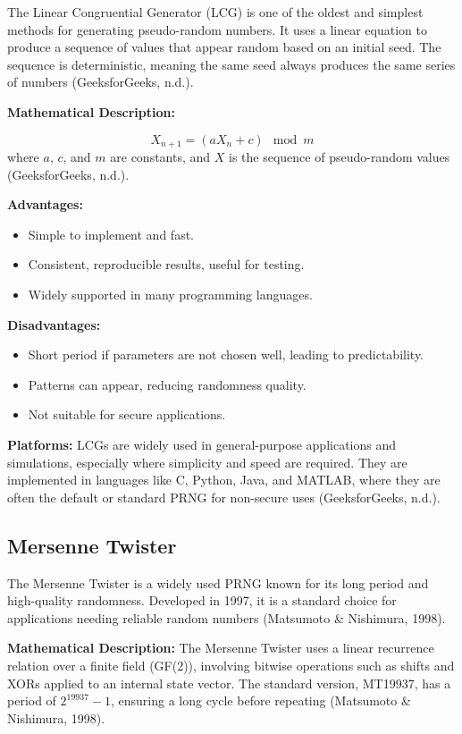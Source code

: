 \documentclass[a4paper,12pt]{report}
\begin{document}
The Linear Congruential Generator (LCG) is one of the oldest and simplest methods for generating pseudo-random numbers. It uses a linear equation to produce a sequence of values that appear random based on an initial seed. The sequence is deterministic, meaning the same seed always produces the same series of numbers (GeeksforGeeks, n.d.).

\textbf{Mathematical Description:} 

\[X_{n+1} = (aX_n + c) \mod m\]
where \(a\), \(c\), and \(m\) are constants, and \(X\) is the sequence of pseudo-random values (GeeksforGeeks, n.d.).

\textbf{Advantages:}
\begin{itemize}
    \item Simple to implement and fast.
    \item Consistent, reproducible results, useful for testing.
    \item Widely supported in many programming languages.
\end{itemize}

\textbf{Disadvantages:}
\begin{itemize}
    \item Short period if parameters are not chosen well, leading to predictability.
    \item Patterns can appear, reducing randomness quality.
    \item Not suitable for secure applications.
\end{itemize}

\textbf{Platforms:} LCGs are widely used in general-purpose applications and simulations, especially where simplicity and speed are required. They are implemented in languages like C, Python, Java, and MATLAB, where they are often the default or standard PRNG for non-secure uses (GeeksforGeeks, n.d.).

\subsection{Mersenne Twister}

The Mersenne Twister is a widely used PRNG known for its long period and high-quality randomness. Developed in 1997, it is a standard choice for applications needing reliable random numbers (Matsumoto \& Nishimura, 1998).

\textbf{Mathematical Description:} 
The Mersenne Twister uses a linear recurrence relation over a finite field (GF(2)), involving bitwise operations such as shifts and XORs applied to an internal state vector. The standard version, MT19937, has a period of \(2^{19937} - 1\), ensuring a long cycle before repeating (Matsumoto \& Nishimura, 1998).
\end{document}
